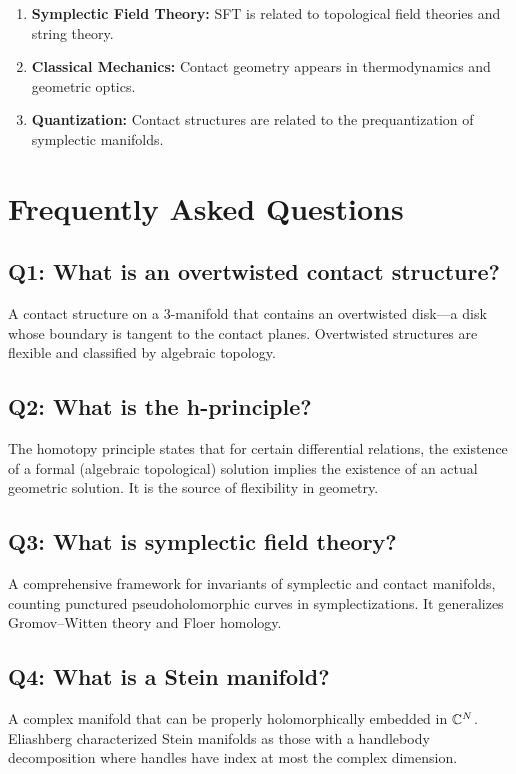 \begin{enumerate}
    \item \textbf{Symplectic Field Theory:} SFT is related to topological field theories and string theory.
    \item \textbf{Classical Mechanics:} Contact geometry appears in thermodynamics and geometric optics.
    \item \textbf{Quantization:} Contact structures are related to the prequantization of symplectic manifolds.
\end{enumerate}

\section{Frequently Asked Questions}

\subsection*{Q1: What is an overtwisted contact structure?}
A contact structure on a 3-manifold that contains an overtwisted disk—a disk whose boundary is tangent to the contact planes. Overtwisted structures are flexible and classified by algebraic topology.

\subsection*{Q2: What is the h-principle?}
The homotopy principle states that for certain differential relations, the existence of a formal (algebraic topological) solution implies the existence of an actual geometric solution. It is the source of flexibility in geometry.

\subsection*{Q3: What is symplectic field theory?}
A comprehensive framework for invariants of symplectic and contact manifolds, counting punctured pseudoholomorphic curves in symplectizations. It generalizes Gromov--Witten theory and Floer homology.

\subsection*{Q4: What is a Stein manifold?}
A complex manifold that can be properly holomorphically embedded in $\mathbb{C}^N$. Eliashberg characterized Stein manifolds as those with a handlebody decomposition where handles have index at most the complex dimension.

